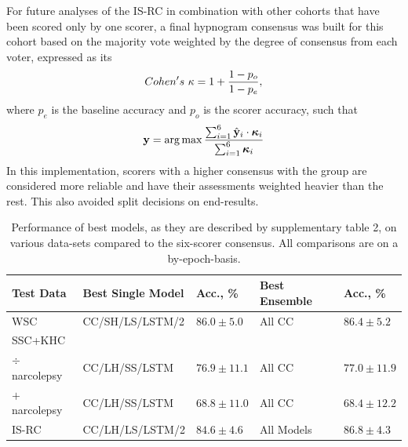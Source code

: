 For future analyses of the IS-RC in combination with other cohorts that have been scored only by one scorer, a final hypnogram consensus was built for this cohort based on the majority vote weighted by the degree of consensus from each voter, expressed as its 
\begin{equation}
    Cohen's~\kappa = 1 + \frac{1 - p_o}{1 - p_e},
\end{equation}
where $p_e$ is the baseline accuracy and $p_o$ is the scorer accuracy, such that
\begin{equation}
    \mathbf{y} = \operatorname*{arg\,max} \frac{\sum_{i=1}^{6} \hat{\mathbf{y}}_i \cdot \boldsymbol{\kappa}_i}{\sum_{i=1}^{6} \boldsymbol{\kappa}_i}
\end{equation}
In this implementation, scorers with a higher consensus with the group are considered more reliable and have their assessments weighted heavier than the rest.
This also avoided split decisions on end-results.
\begin{table}
    \centering
    \caption{Performance of best models, as they are described by supplementary table 2, on various data-sets compared to the six-scorer consensus. All comparisons are on a by-epoch-basis.}
    \label{tab:paperiii-table02}
    \small
    \begin{tabular}{@{}lllll@{}}
        \toprule
        Test Data          & Best Single Model & Acc., \% & Best Ensemble & Acc., \% \\ \midrule
        WSC                & CC/SH/LS/LSTM/2   & $86.0 \pm 5.0$       & All CC        & $86.4 \pm 5.2$       \\
        SSC+KHC & & & & \\
        \quad $\div$ narcolepsy            & CC/LH/SS/LSTM     & $76.9 \pm 11.1$      & All CC        & $77.0 \pm 11.9$      \\
        \quad $+$ narcolepsy & CC/LH/SS/LSTM     & $68.8 \pm 11.0$      & All CC        & $68.4 \pm 12.2$      \\
        IS-RC              & CC/LH/LS/LSTM/2   & $84.6 \pm 4.6$       & All Models    & $86.8 \pm 4.3$       \\ \bottomrule
    \end{tabular}
\end{table}

